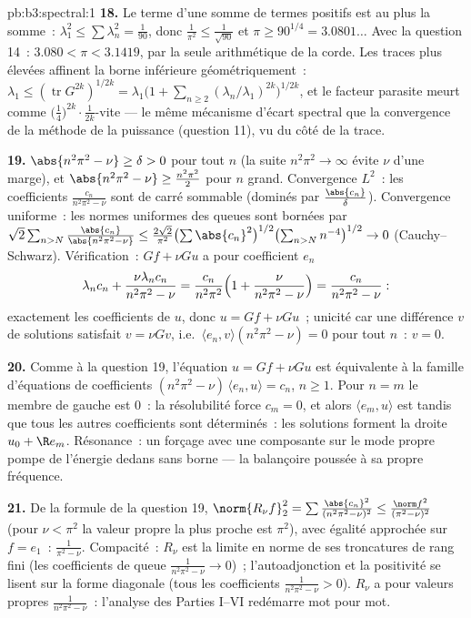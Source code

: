 \begin{solution}{pb:b3:spectral:1}
\textbf{18.} Le terme  d'une somme de termes positifs
est au plus la somme~: $\lambda_1^2 \leq \sum\lambda_n^2 =
\frac1{90}$, donc $\frac1{\pi^2} \leq \frac1{\sqrt{90}}$ et
$\pi \geq 90^{1/4} = 3.0801\ldots$ Avec la question 14~:
$3.080 < \pi < 3.1419$, par la seule arithmétique de la
corde. Les traces plus élevées affinent la borne inférieure
géométriquement~: $\lambda_1 \leq
(\operatorname{tr}G^{2k})^{1/2k} =
\lambda_1\bigl(1 + \sum_{n\geq2}(\lambda_n/\lambda_1)^{2k}
\bigr)^{1/2k}$, et le facteur parasite meurt comme
$\bigl(\tfrac14\bigr)^{2k}\cdot\frac1{2k}$-vite --- le même
mécanisme d'écart spectral que la convergence de la méthode
de la puissance (question 11), vu du côté de la trace.

\textbf{19.} $\abs{n^2\pi^2 - \nu} \geq \delta > 0$ pour tout
$n$ (la suite $n^2\pi^2 \to \infty$ évite $\nu$ d'une
marge), et $\abs{n^2\pi^2 - \nu} \geq \frac{n^2\pi^2}2$ pour
$n$ grand. Convergence $L^2$~: les coefficients
$\frac{c_n}{n^2\pi^2 - \nu}$ sont de carré sommable
(dominés par $\frac{\abs{c_n}}\delta$). Convergence
uniforme~: les normes uniformes des queues sont bornées par
$\sqrt2\sum_{n>N} \frac{\abs{c_n}}{\abs{n^2\pi^2 - \nu}}
\leq \frac{2\sqrt2}{\pi^2}\bigl(\sum\abs{c_n}^2\bigr)^{1/2}
\bigl(\sum_{n>N}n^{-4}\bigr)^{1/2} \to 0$
(Cauchy--Schwarz). Vérification~: $Gf + \nu Gu$ a pour
coefficient $e_n$
\[
\lambda_nc_n + \frac{\nu\lambda_nc_n}{n^2\pi^2 - \nu}
= \frac{c_n}{n^2\pi^2}\Bigl(1 + \frac{\nu}{n^2\pi^2 -
\nu}\Bigr) = \frac{c_n}{n^2\pi^2 - \nu} :
\]
exactement les coefficients de $u$, donc $u = Gf + \nu Gu$~;
unicité car une différence $v$ de solutions satisfait $v =
\nu Gv$, i.e.\ $\langle e_n, v\rangle(n^2\pi^2 - \nu) = 0$
pour tout $n$~: $v = 0$.

\textbf{20.} Comme à la question 19, l'équation $u = Gf +
\nu Gu$ est équivalente à la famille d'équations de
coefficients $(n^2\pi^2 - \nu)\,\langle e_n, u\rangle =
c_n$, $n \geq 1$. Pour $n = m$ le membre de gauche est $0$~:
la résolubilité force $c_m = 0$, et alors $\langle e_m,
u\rangle$ est  tandis que tous les autres coefficients
sont déterminés~: les solutions forment la droite $u_0 + \R
e_m$. Résonance~: un forçage avec une composante sur le mode
propre pompe de l'énergie dedans sans borne --- la
balançoire poussée à sa propre fréquence.

\textbf{21.} De la formule de la question 19, $\norm{R_\nu
f}_2^2 = \sum\frac{\abs{c_n}^2}{(n^2\pi^2 - \nu)^2} \leq
\frac{\norm f^2}{(\pi^2 - \nu)^2}$ (pour $\nu < \pi^2$ la
valeur propre la plus proche est $\pi^2$), avec égalité
approchée sur $f = e_1$~:  $\frac1{\pi^2 -
\nu}$. Compacité~: $R_\nu$ est la limite en norme de ses
troncatures de rang fini (les coefficients de queue
$\frac1{n^2\pi^2 - \nu} \to 0$)~; l'autoadjonction et la
positivité se lisent sur la forme diagonale (tous les
coefficients $\frac1{n^2\pi^2 - \nu} > 0$). $R_\nu$ a pour
valeurs propres $\frac1{n^2\pi^2 - \nu}$~: l'analyse des
Parties I--VI redémarre mot pour mot.


\end{solution}
